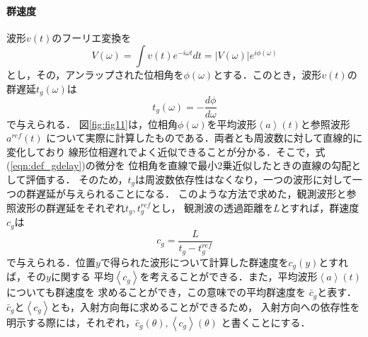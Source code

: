 \paragraph{群速度}
波形$v(t)$のフーリエ変換を
\begin{equation}
	V(\omega)=\int v(t)e^{-i\omega t} dt = \left| V(\omega) \right|e^{i\phi(\omega)}
	\label{eqn:phase}
\end{equation}
とし，その，アンラップされた位相角を$\phi(\omega)$とする．このとき，波形$v(t)$の
群遅延$t_g(\omega)$は
\begin{equation}
	t_g(\omega)=-\frac{d\phi}{d\omega}
	\label{eqn:def_gdelay}
\end{equation}
で与えられる．
図\ref{fig:fig11}は，位相角$\phi(\omega)$を平均波形$\left<a\right>(t)$と参照波形$a^{ref}(t)$
について実際に計算したものである．両者とも周波数に対して直線的に変化しており
線形位相遅れでよく近似できることが分かる．そこで，式(\ref{eqn:def_gdelay})の微分を
位相角を直線で最小2乗近似したときの直線の勾配として評価する．
そのため，$t_g$は周波数依存性はなくなり，一つの波形に対して一つの群遅延が与えられることになる．
このような方法で求めた，観測波形と参照波形の群遅延をそれぞれ$t_g, t_g^{ref}$とし，
観測波の透過距離を$L$とすれば，群速度$c_g$は
\begin{equation}
	c_g=\frac{L}{t_g-t_g^{ref}}
	\label{eqn:def_cg}
\end{equation}
で与えられる．位置$y$で得られた波形について計算した群速度を$c_g(y)$とすれば，その$y$に関する
平均$\left< c_g \right>$を考えることができる．また，平均波形$\left<a\right>(t)$についても群速度を
求めることができ，この意味での平均群速度を $\bar c_g$と表す．
$\bar c_g$と$\left< c_g \right>$とも，入射方向毎に求めることができるため，
入射方向への依存性を明示する際には，それぞれ，$\bar c_g(\theta), \left< c_g\right>(\theta)$
と書くことにする．
